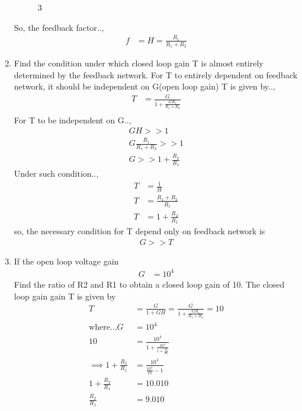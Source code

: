 \begin{enumerate}[label=\thesubsection.\arabic*.,ref=\thesubsection.\theenumi]
\begin{figure}[!ht]
	\begin{center}
			\resizebox{\columnwidth}{!}{}
	\end{center}
\caption{3}
\label{fig:equivalent_control_system}
\end{figure}
So, the feedback factor..,
\begin{align}
     f &= H = \frac{R_1}{R_1+R_2}
\end{align}
\item Find the condition under which closed loop gain T is almost entirely determined by the feedback network.
\solution For T to entirely dependent on feedback network, it should be independent on G(open loop gain)
T is given by..,
\begin{align}
    T &= \frac{G}{1+\frac{GR_1}{R_1+R_2}} \\
\end{align}
For T to be independent on G..,
\begin{align}
 GH >> 1 \\
 G\frac{R_1}{R_1+R_2} >> 1 \\
 G >> 1 + \frac{R_2}{R_1} 
\end{align}
Under such condition..,
\begin{align}
    T &= \frac{1}{H} \\
    T &= \frac{R_1+R_2}{R_1}\\
    T &= 1+\frac{R_2}{R_1}
\end{align}
so, the necessary condition for T depend only on feedback network is
\begin{align}
    G >> T
\end{align}
\item If the open loop voltage gain
\begin{align} 
G & = 10^4
\end{align}
Find the ratio of R2 and R1 to obtain a closed loop gain of 10.
\solution The closed loop gain gain T is given by
\begin{align}
    T &= \frac{G}{1+GH}
        = \frac{G}{1+\frac{GR_1}{R_1+R_2}} = 10\\
    \text{where..,} G &= 10^4 \\
    10 &= \frac{10^4}{1+\frac{10^4}{1+\frac{R_2}{R_1}}}\\
\implies 1+\frac{R_2}{R_1} &= \frac{10^4}{\frac{10^4}{10}-1}
\\
1+\frac{R_2}{R_1} &= 10.010
\\
\frac{R_2}{R_1} &= 9.010

\end{align}
\end{enumerate}
